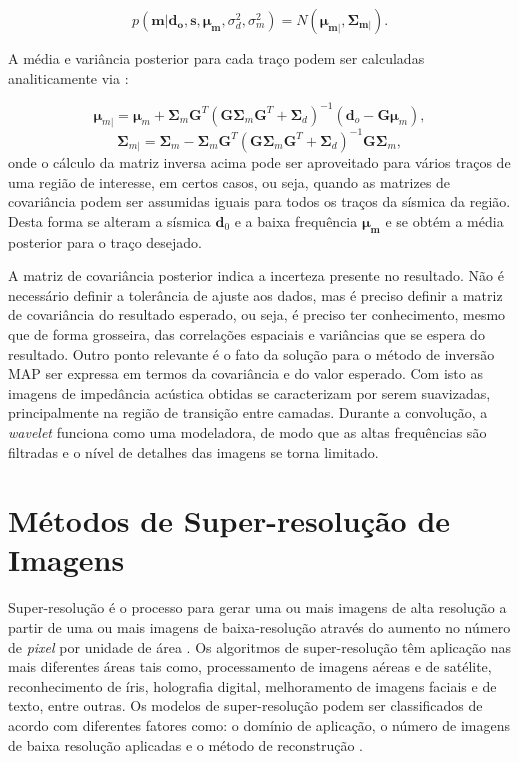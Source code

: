 \begin{equation}
p(\boldsymbol{m}|\boldsymbol{d_{o}},\boldsymbol{s},\boldsymbol{\mu_{m}},\sigma_{d}^{2},\sigma_{m}^{2}) = 
N(\boldsymbol{\mu_{m|}},\boldsymbol{\Sigma_{m|}}).
\end{equation} 

A média e variância posterior para cada traço podem ser calculadas analiticamente via \citep{leandroGRSL}:

\begin{equation}
\label{eqn:mapSolution}
\boldsymbol{\mu}_{m|} = \boldsymbol{\mu}_{m} + \boldsymbol{\Sigma}_{m}\boldsymbol{G}^{T}(\boldsymbol{G\Sigma}_{m}\boldsymbol{G}^{T}+\boldsymbol{\Sigma}_{d})^{-1}\left ( \boldsymbol{d}_{o} - \boldsymbol{G\mu}_{m} \right ),
\end{equation}
\begin{equation}
\boldsymbol{\Sigma}_{m|} = \boldsymbol{\Sigma}_{m} - \boldsymbol{\Sigma}_{m}\boldsymbol{G}^{T}(\boldsymbol{G\Sigma}_{m}\boldsymbol{G}^{T}+\boldsymbol{\Sigma}_{d})^{-1}\boldsymbol{G\Sigma}_{m},
\end{equation} 
onde o cálculo da matriz inversa acima pode ser aproveitado para vários traços
de uma região de interesse, em certos casos, ou seja, quando as matrizes de
covariância podem ser assumidas iguais para todos os traços da sísmica da região.
Desta forma se alteram a sísmica $\mathbf{d}_0$ e a baixa frequência
$\boldsymbol{\mu_m}$ e se obtém a média posterior para o traço desejado.
  
A matriz de covariância posterior indica a incerteza
presente no resultado. Não é necessário
definir a tolerância de ajuste aos dados, mas é preciso definir a
matriz de covariância do resultado esperado, ou seja, é
preciso ter conhecimento, mesmo que de forma grosseira, das correlações espaciais e
variâncias que se espera do resultado. Outro ponto relevante é o fato da
solução para o método de inversão MAP ser expressa em termos da covariância
e do valor esperado. Com isto as imagens de impedância acústica obtidas
se caracterizam por serem suavizadas, principalmente na região de
transição entre camadas. Durante a convolução, a \textit{wavelet} funciona
como uma modeladora, de modo que as altas frequências são filtradas
e o nível de detalhes das imagens se torna limitado. 

\section{Métodos de Super-resolução de Imagens}
Super-resolução é o processo para gerar uma ou mais imagens de alta
resolução a partir de uma ou mais imagens de baixa-resolução
através do aumento no número de \textit{pixel} por unidade de área \cite{Nasrollahi2014}.
Os algoritmos de super-resolução têm aplicação nas mais diferentes áreas
tais como, processamento de imagens aéreas e de satélite, reconhecimento de
íris, holografia digital, melhoramento de imagens faciais e de texto, entre
outras. Os modelos de super-resolução podem ser classificados
de acordo com diferentes fatores como: o domínio de aplicação,
o número de imagens de baixa resolução aplicadas e o método de reconstrução \citep{Nasrollahi2014}.

